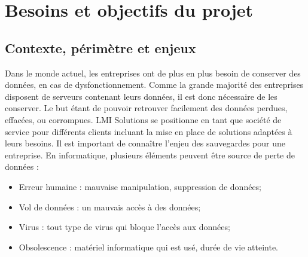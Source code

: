 \documentclass[pfe]{tnreport} %
\begin{document}
\clearpage


\chapter{Besoins et objectifs du projet}

\section{Contexte, périmètre et enjeux}

Dans le monde actuel, les entreprises ont de plus en plus besoin de conserver des données, en cas de dysfonctionnement. \newline
Comme la grande majorité des entreprises disposent de serveurs contenant leurs données, il est donc nécessaire de les conserver. Le but étant de pouvoir retrouver facilement des données perdues, effacées, ou corrompues. \newline
LMI Solutions se positionne en tant que société de service pour différents clients incluant la mise en place de solutions adaptées à leurs besoins. \newline
Il est important de connaître l'enjeu des sauvegardes pour une entreprise. En informatique, plusieurs éléments peuvent être source de perte de données : \newline
\begin{itemize}
 \item Erreur humaine : mauvaise manipulation, suppression de données;
 \item Vol de données : un mauvais accès à des données;
 \item Virus : tout type de virus qui bloque l'accès aux données;
 \item Obsolescence : matériel informatique qui est usé, durée de vie atteinte. \newline
\end{itemize} 
\end{document}
